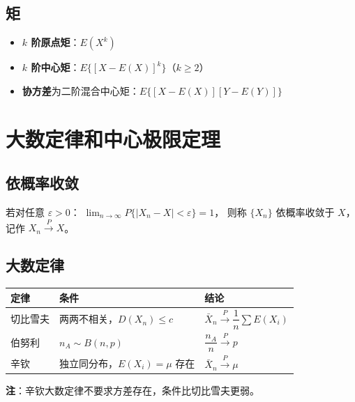 \documentclass[12pt, a4paper]{article}
\begin{document}
\subsection{矩}

\begin{itemize}
    \item \textbf{$k$ 阶原点矩}：$E(X^k)$
    \item \textbf{$k$ 阶中心矩}：$E\{[X-E(X)]^k\}$（$k\ge 2$）
    \item \textbf{协方差}为二阶混合中心矩：$E\{[X-E(X)][Y-E(Y)]\}$
\end{itemize}

\section{大数定律和中心极限定理}

\subsection{依概率收敛}

\begin{tcolorbox}[defbox, title={依概率收敛}]
    若对任意 $\varepsilon>0$：
    $\displaystyle\lim_{n\to\infty}P\{|X_n-X|<\varepsilon\}=1$，
    则称 $\{X_n\}$ 依概率收敛于 $X$，记作 $X_n\xrightarrow{P}X$。
\end{tcolorbox}

\subsection{大数定律}

\begin{tcolorbox}[thmbox, title={三个大数定律对比}]
    \begin{center}
        \renewcommand{\arraystretch}{1.5}
        \begin{tabular}{@{}lll@{}}
            \toprule
            定律   & 条件                    & 结论                                                \\
            \midrule
            切比雪夫 & 两两不相关，$D(X_n)\le c$   & $\bar{X}_n\xrightarrow{P}\dfrac{1}{n}\sum E(X_i)$ \\[6pt]
            伯努利  & $n_A\sim B(n,p)$      & $\dfrac{n_A}{n}\xrightarrow{P}p$                  \\[6pt]
            辛钦   & 独立同分布，$E(X_i)=\mu$ 存在 & $\bar{X}_n\xrightarrow{P}\mu$                     \\
            \bottomrule
        \end{tabular}
    \end{center}
    \textbf{注}：辛钦大数定律不要求方差存在，条件比切比雪夫更弱。
\end{tcolorbox}
\end{document}
